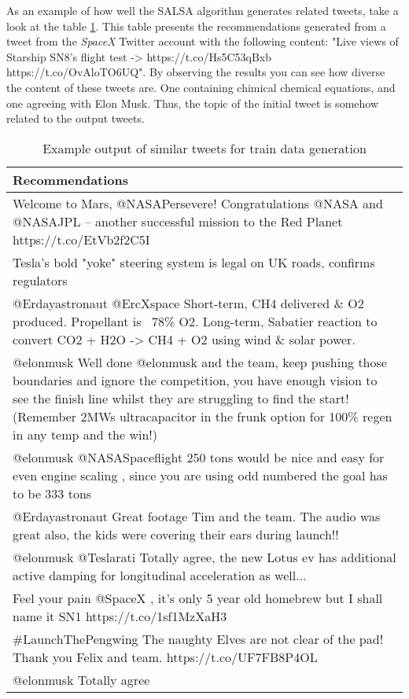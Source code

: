 As an example of how well the SALSA algorithm generates related tweets, take a look at the table \ref{tab:example-train-data}. This table presents the recommendations generated from a tweet from the \emph{SpaceX} Twitter account with the following content: "Live views of Starship SN8’s flight test -> https://t.co/Hs5C53qBxb https://t.co/OvAloTO6UQ". By observing the results you can see how diverse the content of these tweets are. One containing chimical chemical equations, and one agreeing with Elon Musk. Thus, the topic of the initial tweet is somehow related to the output tweets.

\begin{table}[!h]
	\centering
	\caption{Example output of similar tweets for train data generation}
	\label{tab:example-train-data}
	\begin{tabular}{|m{}|}
		\hline
		\textbf{Recommendations} \\
		\hline
		Welcome to Mars, @NASAPersevere! Congratulations @NASA and @NASAJPL – another successful mission to the Red Planet https://t.co/EtVb2f2C5I \\
		\hline
		Tesla’s bold "yoke" steering system is legal on UK roads, confirms regulators \\
		\hline
		@Erdayastronaut @ErcXspace Short-term, CH4 delivered \& O2 produced. Propellant is ~78\% O2. Long-term, Sabatier reaction to convert CO2 + H2O -> CH4 + O2 using wind \& solar power. \\
		\hline
		@elonmusk Well done @elonmusk and the team, keep pushing those boundaries and ignore the competition,  you have enough vision to see the finish line whilst they are struggling to find the start! (Remember 2MWs ultracapacitor in the frunk option for 100\% regen in any temp and the win!) \\
		\hline
		@elonmusk @NASASpaceflight 250 tons would be nice and easy for even engine scaling , since you are using odd numbered the goal has to be 333 tons \\
		\hline
		@Erdayastronaut Great footage Tim and the team. The audio was great also,  the kids were covering their ears during launch!! \\
		\hline
		@elonmusk @Teslarati Totally agree, the new Lotus ev has additional active damping for longitudinal acceleration as well... \\
		\hline
		Feel your pain @SpaceX , it's only 5 year old homebrew but I shall name it SN1 https://t.co/1sf1MzXaH3 \\
		\hline
		\#LaunchThePengwing The naughty Elves are not clear of the pad! Thank you Felix and team. https://t.co/UF7FB8P4OL \\
		\hline
		@elonmusk Totally agree \\
		\hline
	\end{tabular}
\end{table}


